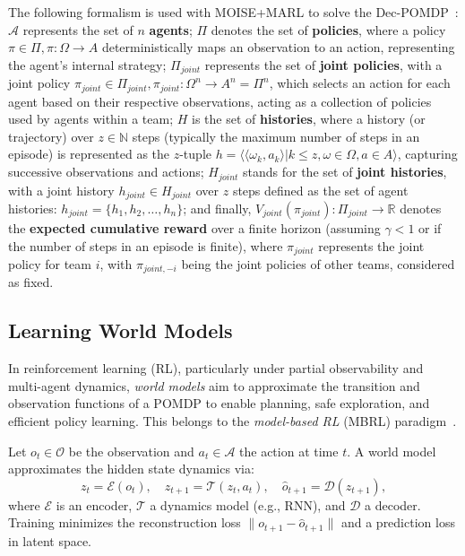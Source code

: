 \documentclass[pdflatex,sn-mathphys-num]{sn-jnl}%
\theoremstyle{thmstyleone}%
\theoremstyle{thmstyletwo}%
\theoremstyle{thmstylethree}%
\begin{document}
The following formalism is used with MOISE+MARL to solve the Dec-POMDP~\cite{Beynier2013,Albrecht2024}: $\mathcal{A}$ represents the set of $n$ \textbf{agents}; $\Pi$ denotes the set of \textbf{policies}, where a policy $\pi \in \Pi, \pi: \Omega \rightarrow A$ deterministically maps an observation to an action, representing the agent's internal strategy; $\Pi_{joint}$ represents the set of \textbf{joint policies}, with a joint policy $\pi_{joint} \in \Pi_{joint}, \pi_{joint}: \Omega^n \rightarrow A^n = \Pi^n$, which selects an action for each agent based on their respective observations, acting as a collection of policies used by agents within a team; $H$ is the set of \textbf{histories}, where a history (or trajectory) over $z \in \mathbb{N}$ steps (typically the maximum number of steps in an episode) is represented as the $z$-tuple $h = \langle \langle \omega_{k}, a_{k}\rangle | k \leq z, \omega \in \Omega, a \in A\rangle$, capturing successive observations and actions; $H_{joint}$ stands for the set of \textbf{joint histories}, with a joint history $h_{joint} \in H_{joint}$ over $z$ steps defined as the set of agent histories: $h_{joint} = \{h_1, h_2, \dots, h_n\}$; and finally, $V_{joint}(\pi_{joint}): \Pi_{joint} \rightarrow \mathbb{R}$ denotes the \textbf{expected cumulative reward} over a finite horizon (assuming $\gamma < 1$ or if the number of steps in an episode is finite), where $\pi_{joint}$ represents the joint policy for team $i$, with $\pi_{joint,-i}$ being the joint policies of other teams, considered as fixed.



\subsection{Learning World Models}

In reinforcement learning (RL), particularly under partial observability and multi-agent dynamics, \textit{world models} aim to approximate the transition and observation functions of a POMDP to enable planning, safe exploration, and efficient policy learning. This belongs to the \textit{model-based RL} (MBRL) paradigm~\cite{moerland2020model}.

Let $o_t \in \mathcal{O}$ be the observation and $a_t \in \mathcal{A}$ the action at time $t$. A world model approximates the hidden state dynamics via:
\[
z_t = \mathcal{E}(o_t), \quad
z_{t+1} = \mathcal{T}(z_t, a_t), \quad
\hat{o}_{t+1} = \mathcal{D}(z_{t+1}),
\]
where $\mathcal{E}$ is an encoder, $\mathcal{T}$ a dynamics model (e.g., RNN), and $\mathcal{D}$ a decoder. Training minimizes the reconstruction loss $\|o_{t+1} - \hat{o}_{t+1}\|$ and a prediction loss in latent space.
\end{document}
